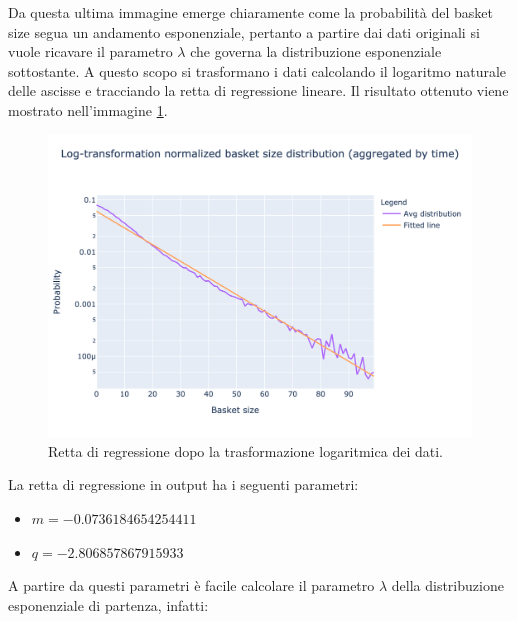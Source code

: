 Da questa ultima immagine emerge chiaramente come la probabilità del basket size segua un andamento esponenziale, pertanto a partire dai dati originali si vuole ricavare il parametro $\lambda$ che governa la distribuzione esponenziale sottostante. A questo scopo si trasformano i dati calcolando il logaritmo naturale delle ascisse e tracciando la retta di regressione lineare. Il risultato ottenuto viene mostrato nell'immagine \ref{fig:regression_log}.

\begin{figure}[H]
	\centering
	\includegraphics[width=14cm]{"images/basket_size_log.png"}
	\caption{Retta di regressione dopo la trasformazione logaritmica dei dati.}
	\label{fig:regression_log}
\end{figure}

La retta di regressione in output ha i seguenti parametri:
\begin{itemize}
	\item $m = -0.0736184654254411$
	\item $q = -2.806857867915933$
\end{itemize}
A partire da questi parametri è facile calcolare il parametro $\lambda$ della distribuzione esponenziale di partenza, infatti:

